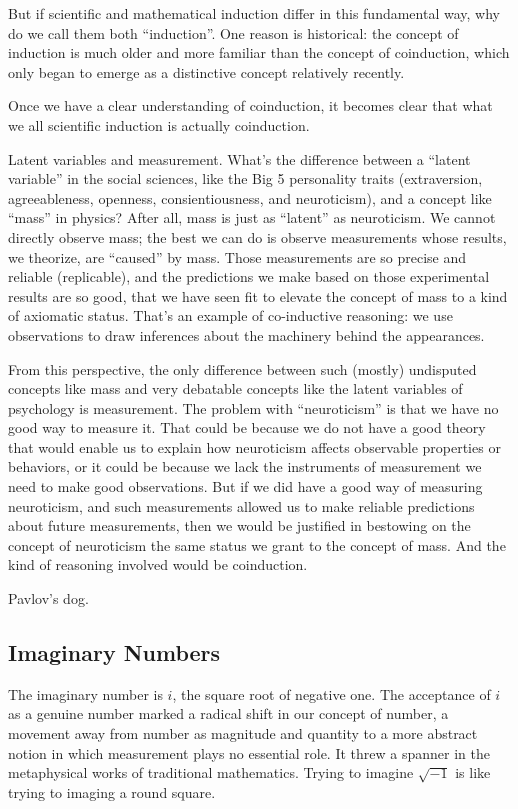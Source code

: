 \documentclass{article}
\begin{document}
But if scientific and mathematical induction differ in this
fundamental way, why do we call them both ``induction''. One reason is
historical: the concept of induction is much older and more familiar
than the concept of coinduction, which only began to emerge as a
distinctive concept relatively recently.

Once we have a clear understanding of coinduction, it becomes clear
that what we all scientific induction is actually coinduction.

Latent variables and measurement. What's the difference between a
``latent variable'' in the social sciences, like the Big 5 personality
traits (extraversion, agreeableness, openness, consientiousness, and
neuroticism), and a concept like ``mass'' in physics? After all, mass
is just as ``latent'' as neuroticism. We cannot directly observe mass;
the best we can do is observe measurements whose results, we theorize,
are ``caused'' by mass. Those measurements are so precise and reliable
(replicable), and the predictions we make based on those experimental
results are so good, that we have seen fit to elevate the concept of
mass to a kind of axiomatic status. That's an example of co-inductive
reasoning: we use observations to draw inferences about the machinery
behind the appearances.

From this perspective, the only difference between such (mostly)
undisputed concepts like mass and very debatable concepts like the
latent variables of psychology is measurement. The problem with
``neuroticism'' is that we have no good way to measure it. That could
be because we do not have a good theory that would enable us to
explain how neuroticism affects observable properties or behaviors, or
it could be because we lack the instruments of measurement we need to
make good observations. But if we did have a good way of measuring
neuroticism, and such measurements allowed us to make reliable
predictions about future measurements, then we would be justified in
bestowing on the concept of neuroticism the same status we grant to
the concept of mass. And the kind of reasoning involved would be
coinduction.

Pavlov's dog.

\subsection{Imaginary Numbers}

The imaginary number is \(i\), the square root of negative one. The
acceptance of \(i\) as a genuine number marked a radical shift in our
concept of number, a movement away from number as magnitude and
quantity to a more abstract notion in which measurement plays no
essential role. It threw a spanner in the metaphysical works of
traditional mathematics. Trying to imagine \(\sqrt{-1}\) is like
trying to imaging a round square.
\end{document}
